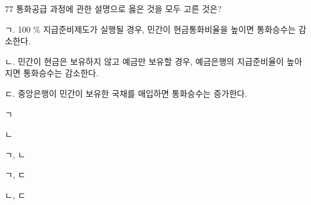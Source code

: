 \begin{question}{77}
통화공급 과정에 관한 설명으로 옳은 것을 모두 고른 것은?
\begin{framedtext}
ㄱ. 100 \% 지급준비제도가 실행될 경우, 민간이 현금통화비율을 높이면 통화승수는 감소한다. \par
ㄴ. 민간이 현금은 보유하지 않고 예금만 보유할 경우, 예금은행의 지급준비율이 높아지면 통화승수는 감소한다. \par
ㄷ. 중앙은행이 민간이 보유한 국채를 매입하면 통화승수는 증가한다.
\end{framedtext}
\begin{choices}
  \item ㄱ
  \item ㄴ
  \item ㄱ, ㄴ
  \item ㄱ, ㄷ
  \item ㄴ, ㄷ
\end{choices}
\end{question}
